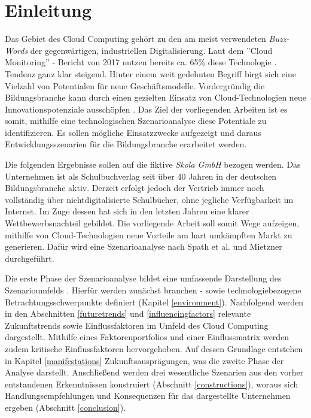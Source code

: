 \section{Einleitung}
\label{introduction}
Das Gebiet des Cloud Computing gehört zu den am meist verwendeten \textit{Buzz-Words} der gegenwärtigen, industriellen Digitalisierung. Laut dem ''Cloud Monitoring'' - Bericht von 2017 nutzen bereits ca. 65\% diese Technologie \cite{bitkom}. Tendenz ganz klar steigend. Hinter einem weit gedehnten Begriff birgt sich eine Vielzahl von Potentialen für neue Geschäftsmodelle. Vordergründig die Bildungsbranche kann durch einen gezielten Einsatz von Cloud-Technologien neue Innovationspotenziale ausschöpfen \cite{meinel2}. Das Ziel der vorliegenden Arbeiten ist es somit, mithilfe eine technologischen Szenarioanalyse diese Potentiale zu identifizieren. Es sollen mögliche Einsatzzwecke aufgezeigt und daraus Entwicklungsszenarien für die Bildungsbranche erarbeitet werden.

Die folgenden Ergebnisse sollen auf die fiktive \textit{Skola GmbH} bezogen werden. Das Unternehmen ist als Schulbuchverlag seit über 40 Jahren in der deutschen Bildungsbranche aktiv. Derzeit erfolgt jedoch der Vertrieb immer noch vollständig über nichtdigitalisierte Schulbücher, ohne jegliche Verfügbarkeit im Internet. Im Zuge dessen hat sich in den letzten Jahren eine klarer Wettbewerbsnachteil gebildet. Die vorliegende Arbeit soll somit Wege aufzeigen, mithilfe von Cloud-Technologien neue Vorteile am hart umkämpften Markt zu generieren. Dafür wird eine Szenarioanalyse nach Spath et al. \cite{spath} und Mietzner \cite{mietzner} durchgeführt.

Die erste Phase der Szenarioanalyse bildet eine umfassende Darstellung des Szenarioumfelds  \cite{spath}. Hierfür werden zunächst branchen - sowie technologiebezogene Betrachtungsschwerpunkte definiert (Kapitel \ref{environment}). Nachfolgend werden in den Abschnitten \ref{futuretrends} und \ref{influencingfactors} relevante Zukunftstrends sowie Einflussfaktoren im Umfeld des Cloud Computing dargestellt. Mithilfe eines Faktorenportfolios und einer Einflussmatrix werden zudem kritische Einflussfaktoren hervorgehoben. Auf dessen Grundlage entstehen in Kapitel \ref{manifestations} Zukunftsausprägungen, was die zweite Phase der Analyse darstellt. Anschließend werden drei wesentliche Szenarien aus den vorher entstandenen Erkenntnissen konstruiert (Abschnitt \ref{constructions}), woraus sich Handlungsempfehlungen und Konsequenzen für das dargestellte Unternehmen ergeben (Abschnitt \ref{conclusion}).